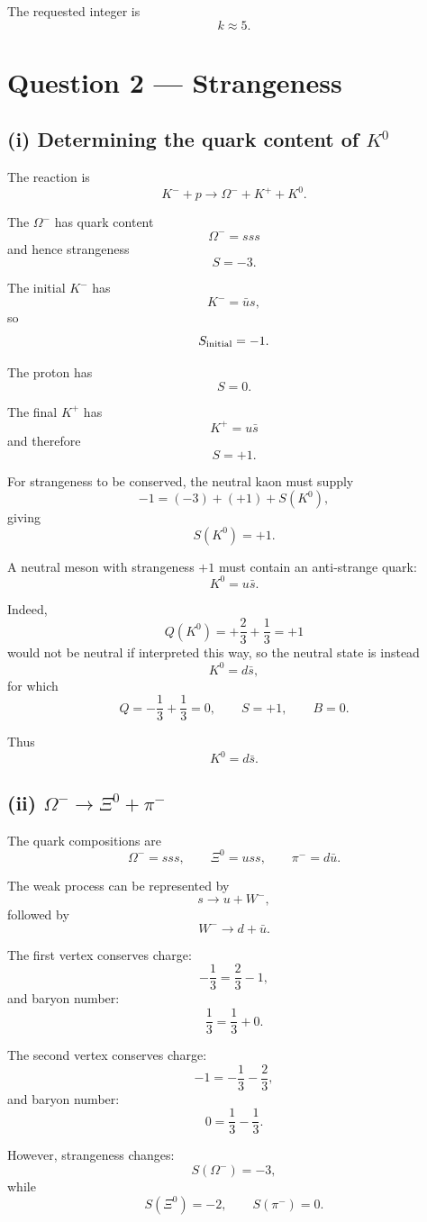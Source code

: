 \documentclass[11pt,a4paper]{article}
\begin{document}
The requested integer is
\[
\boxed{k\approx5}.
\]

\section{Question 2 --- Strangeness}

\subsection{(i) Determining the quark content of $K^0$}

The reaction is
\[
K^-+p\rightarrow\Omega^-+K^++K^0.
\]

The $\Omega^-$ has quark content
\[
\Omega^-=sss
\]
and hence strangeness
\[
S=-3.
\]

The initial $K^-$ has
\[
K^-= \bar us,
\]
so
\[
S_{\rm initial}=-1.
\]

The proton has
\[
S=0.
\]

The final $K^+$ has
\[
K^+=u\bar s
\]
and therefore
\[
S=+1.
\]

For strangeness to be conserved, the neutral kaon must supply
\[
-1=(-3)+(+1)+S(K^0),
\]
giving
\[
S(K^0)=+1.
\]

A neutral meson with strangeness $+1$ must contain an anti-strange quark:
\[
K^0=u\bar s.
\]

Indeed,
\[
Q(K^0)=+\frac23+\frac13=+1
\]
would not be neutral if interpreted this way, so the neutral state is instead
\[
\boxed{K^0=d\bar s},
\]
for which
\[
Q=-\frac13+\frac13=0,
\qquad
S=+1,
\qquad
B=0.
\]

Thus
\[
\boxed{K^0=d\bar s}.
\]

\subsection{(ii) $\Omega^-\rightarrow\Xi^0+\pi^-$}

The quark compositions are
\[
\Omega^-=sss,
\qquad
\Xi^0=uss,
\qquad
\pi^-=d\bar u.
\]

The weak process can be represented by
\[
s\rightarrow u+W^-,
\]
followed by
\[
W^-\rightarrow d+\bar u.
\]

The first vertex conserves charge:
\[
-\frac13=\frac23-1,
\]
and baryon number:
\[
\frac13=\frac13+0.
\]

The second vertex conserves charge:
\[
-1=-\frac13-\frac23,
\]
and baryon number:
\[
0=\frac13-\frac13.
\]

However, strangeness changes:
\[
S(\Omega^-)=-3,
\]
while
\[
S(\Xi^0)=-2,
\qquad
S(\pi^-)=0.
\]
\end{document}
